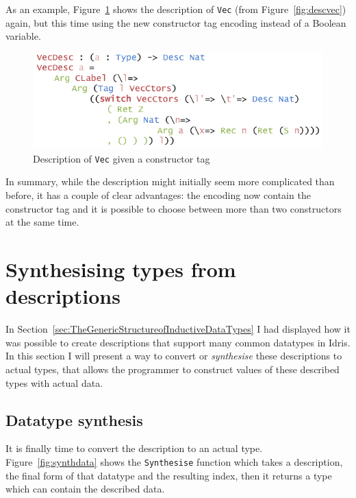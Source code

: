 \documentclass{ituthesis}
\newcommand{\tttype}[1]{\textcolor{type-color}{\texttt{#1}}}
\newcommand{\ttdec}[1]{\textcolor{declared-var-color}{\texttt{#1}}}
\theoremstyle{break}
\begin{document}
As an example, Figure~\ref{fig:vecdescim} shows the description of \tttype{Vec} (from Figure~\ref{fig:descvec}) again, but this time using the new constructor tag encoding instead of a Boolean variable.

\begin{figure}[H]
\begin{center}
    \includegraphics[scale=0.5]{Figures/VectorDescriptionImproved.png}
\end{center}
\caption{Description of \tttype{Vec} given a constructor tag}
\label{fig:vecdescim}
\end{figure}

In summary, while the description might initially seem more complicated than before, it has a couple of clear advantages: the encoding now contain the constructor tag and it is possible to choose between more than two constructors at the same time.

\section{Synthesising types from descriptions}
\label{sec:SynthesisingDescriptionstoTypes}
In Section~\ref{sec:TheGenericStructureofInductiveDataTypes} I had displayed how it was possible to create descriptions that support many common datatypes in Idris.
In this section I will present a way to convert or \textit{synthesise} these descriptions to actual types, that allows the programmer to construct values of these described types with actual data.

\subsection{Datatype synthesis}
\label{sub:DatatypeSynthesis}
It is finally time to convert the description to an actual type. Figure~\ref{fig:synthdata} shows the \ttdec{Synthesise} function which takes a description, the final form of that datatype and the resulting index, then it returns a type which can contain the described data.
\end{document}

